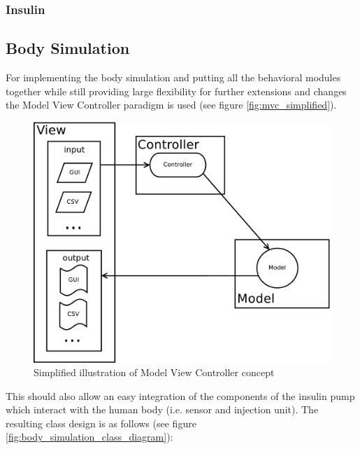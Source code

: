 \subsubsection{Insulin}

\newpage
\subsection{Body Simulation}
\label{sec:body_simulation}
For implementing the body simulation and putting all the behavioral modules
together while still providing large flexibility for further extensions and
changes the Model View Controller paradigm is used (see figure
\vref{fig:mvc_simplified}). 

\begin{figure}[htb]
\centering
\includegraphics[scale=0.4]{images/mvc_simplified}
\caption{Simplified illustration of Model View Controller concept}
\label{fig:mvc_simplified}
\end{figure}

This should also allow an easy integration of the
components of the insulin pump which interact with the human body (i.e. sensor
and injection unit).
The resulting class design is as follows  (see figure
\vref{fig:body_simulation_class_diagram}): 


